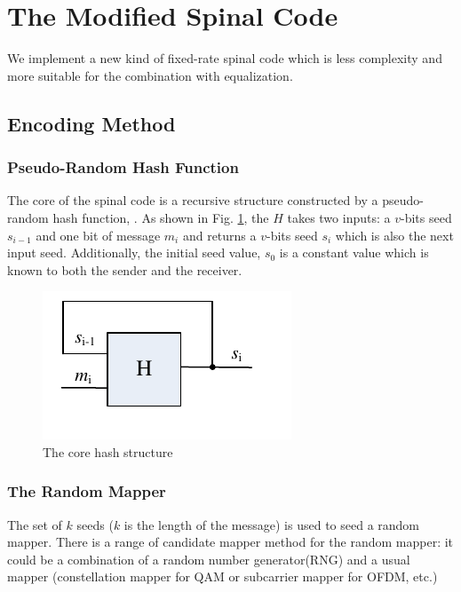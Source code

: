\documentclass[conference]{IEEEtran}
\begin{document}
\section{The Modified Spinal Code}
We implement a new kind of fixed-rate spinal code which is less complexity and more suitable for the combination with equalization.
\subsection{Encoding Method}
\subsubsection{Pseudo-Random Hash Function}
The core of the spinal code is a recursive structure constructed by a pseudo-random hash function, . As shown in Fig. \ref{fig_hash}, the $H$ takes two inputs: a $v$-bits seed $s_{i-1}$ and one bit of message $m_i$ and returns a $v$-bits seed $s_i$ which is also the next input seed. Additionally, the initial seed value, $s_0$ is a constant value which is known to both the sender and the receiver.
\begin{figure}[!t]
\centering
\includegraphics[width=2 in]{encoderCore.pdf}
\caption{The core hash structure}
\label{fig_hash}
\end{figure}
\subsubsection{The Random Mapper}

The set of $k$ seeds ($k$ is the length of the message) is used to seed a random mapper. There is a range of candidate  mapper method for the random mapper: it could be a combination of  a random number generator(RNG) and a usual mapper (constellation mapper for QAM or subcarrier mapper for OFDM, etc.) %
\end{document}

